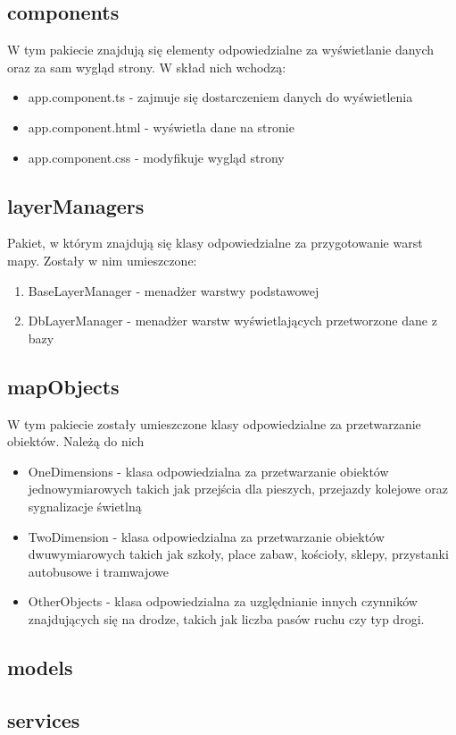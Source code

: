 \subsection{components}
W tym pakiecie znajdują się elementy odpowiedzialne za wyświetlanie danych oraz za sam wygląd strony. W skład nich wchodzą:
\begin{itemize}
\item app.component.ts - zajmuje się dostarczeniem danych do wyświetlenia
\item app.component.html - wyświetla dane na stronie
\item app.component.css - modyfikuje wygląd strony
\end{itemize}
\subsection{layerManagers}
Pakiet, w którym znajdują się klasy odpowiedzialne za przygotowanie warst mapy. Zostały w nim umieszczone:
\begin{enumerate}
\item BaseLayerManager - menadżer warstwy podstawowej
\item DbLayerManager - menadżer warstw wyświetlających przetworzone dane z bazy
\end{enumerate}
\subsection{mapObjects}
W tym pakiecie zostały umieszczone klasy odpowiedzialne za przetwarzanie obiektów. Należą do nich
\begin{itemize}
\item OneDimensions - klasa odpowiedzialna za przetwarzanie obiektów jednowymiarowych takich jak przejścia dla pieszych, przejazdy kolejowe oraz sygnalizacje świetlną
\item TwoDimension - klasa odpowiedzialna za przetwarzanie obiektów dwuwymiarowych takich jak szkoły, place zabaw, kościoły, sklepy, przystanki autobusowe i tramwajowe
\item OtherObjects - klasa odpowiedzialna za uzględnianie innych czynników znajdujących się na drodze, takich jak liczba pasów ruchu czy typ drogi.
\end{itemize}
\subsection{models}
\subsection{services}

